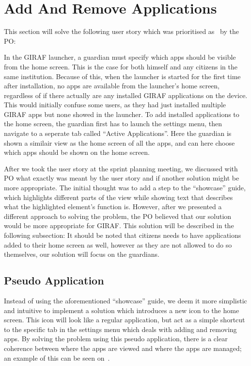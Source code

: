 \section{Add And Remove Applications}
\label{sec:add_and_remove_applications}
This section will solve the following user story which was prioritised as \pmedhigh~by the PO:

In the GIRAF launcher, a guardian must specify which apps should be visible from the home screen.
This is the case for both himself and any citizens in the same institution.
Because of this, when the launcher is started for the first time after installation, no apps are available from the launcher's home screen, regardless of if there actually are any installed GIRAF applications on the device.
This would initially confuse some users, as they had just installed multiple GIRAF apps but none showed in the launcher.
To add installed applications to the home screen, the guardian first has to launch the settings menu, then navigate to a seperate tab called \enquote{Active Applications}.
Here the guardian is shown a similair view as the home screen of all the apps, and can here choose which apps should be shown on the home screen.

After we took the user story at the sprint planning meeting, we discussed with PO what exactly was meant by the user story and if another solution might be more appropriate.
The initial thought was to add a step to the \enquote{showcase} guide, which highlights different parts of the view while showing text that describes what the highlighted element's function is.
However, after we presented a different approach to solving the problem, the PO believed that our solution would be more appropriate for GIRAF.
This solution will be described in the following subsection:
It should be noted that citizens needs to have applications added to their home screen as well, however as they are not allowed to do so themselves, our solution will focus on the guardians.

\subsection{Pseudo Application}
\label{sub:pseudo_application}
Instead of using the aforementioned \enquote{showcase} guide, we deem it more simplistic and intuitive to implement a solution which introduces a new icon to the home screen.
This icon will look like a regular application, but act as a simple shortcut to the specific tab in the settings menu which deals with adding and removing apps.
By solving the problem using this pseudo application, there is a clear coherence between where the apps are viewed and where the apps are managed; an example of this can be seen on~.

